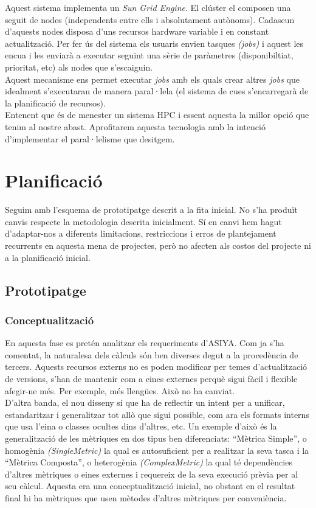 \documentclass[11pt,a4paper]{article}
\begin{document}
Aquest sistema implementa un \textit{Sun Grid Engine}. El clúster el composen una seguit de nodes (independents entre ells i absolutament autònoms). Cadascun d'aquests nodes disposa d'uns recursos hardware variable i en constant actualització. Per fer ús del sistema els usuaris envien tasques \textit{(jobs)} i aquest les encua i les enviarà a executar seguint una sèrie de paràmetres (disponibiltiat, prioritat, etc) als nodes que s'escaiguin.
\\

Aquest mecanisme ens permet executar \textit{jobs} amb els quals crear altres \textit{jobs} que idealment s'executaran de manera paral·lela (el sistema de cues s'encarregarà de la planificació de recursos). 
\\

Entenent que és de menester un sistema HPC i essent aquesta la millor opció que tenim al nostre abast. Aprofitarem aquesta tecnologia amb la intenció d'implementar el paral·lelisme que desitgem. 

\newpage
\section{Planificació}
Seguim amb l'esquema de prototipatge descrit a la fita inicial. No s'ha produït canvis respecte la metodologia descrita inicialment. Sí en canvi hem hagut d'adaptar-nos a diferents limitacions, restriccions i erros de plantejament recurrents en aquesta mena de projectes, però no afecten als costos del projecte ni a la planificació inicial.

\subsection{Prototipatge}

\subsubsection{Conceptualització}
En aquesta fase es pretén analitzar els requeriments d’ASIYA. Com ja s'ha comentat, la naturalesa dels càlculs són ben diverses degut a la procedència de tercers. Aquests recursos externs no es poden modificar per temes d’actualització de versions, s’han de mantenir com a eines externes perquè sigui fàcil i flexible afegir-ne més. Per exemple, més llengües. Això no ha canviat. 
\\

D’altra banda, el nou disseny sí que ha de reflectir un intent per a unificar, estandaritzar i generalitzar tot allò que sigui possible, com ara els formats interns que usa l’eina o classes ocultes dins d’altres, etc. Un exemple d’això és la generalització de les mètriques en dos tipus ben diferenciats: “Mètrica Simple”, o homogènia \textit{(SingleMetric)} la qual es autosuficient per a realitzar la seva tasca i la “Mètrica Composta”, o heterogènia \textit{(ComplexMetric)} la qual té dependències d’altres mètriques o eines externes i requereix de la seva execució prèvia per al seu càlcul. Aquesta era una conceptualització inicial, no obstant en el resultat final hi ha mètriques que usen mètodes d’altres mètriques per conveniència.
\end{document}
